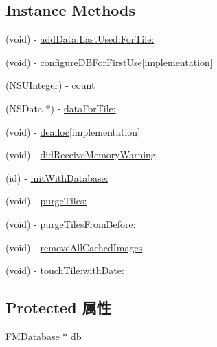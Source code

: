 \subsection*{Instance Methods}
\begin{DoxyCompactItemize}
\item 
(void) -\/ \hyperlink{interface_r_m_tile_cache_d_a_o_aa0f837ba4f88e61e11f80539ab4447b6}{add\-Data\-:\-Last\-Used\-:\-For\-Tile\-:}
\item 
(void) -\/ \hyperlink{interface_r_m_tile_cache_d_a_o_a5576502807bbdfbe130364ccf543f944}{configure\-D\-B\-For\-First\-Use}{\ttfamily  \mbox{[}implementation\mbox{]}}
\item 
(N\-S\-U\-Integer) -\/ \hyperlink{interface_r_m_tile_cache_d_a_o_a2781dde5bf63915b2a7a759b328473bd}{count}
\item 
(N\-S\-Data $\ast$) -\/ \hyperlink{interface_r_m_tile_cache_d_a_o_a83bb633ee07230152bf11382fd065da3}{data\-For\-Tile\-:}
\item 
(void) -\/ \hyperlink{interface_r_m_tile_cache_d_a_o_aa0313e459b023f60fdbefd5635f35e57}{dealloc}{\ttfamily  \mbox{[}implementation\mbox{]}}
\item 
(void) -\/ \hyperlink{interface_r_m_tile_cache_d_a_o_af5ca74dfbe1355cbd479ed7844fd03da}{did\-Receive\-Memory\-Warning}
\item 
(id) -\/ \hyperlink{interface_r_m_tile_cache_d_a_o_a255de16d0b9de6c9974f48dd2ec0f0c3}{init\-With\-Database\-:}
\item 
(void) -\/ \hyperlink{interface_r_m_tile_cache_d_a_o_ae44d63a1f9fc1da15fbb9dbac7129b61}{purge\-Tiles\-:}
\item 
(void) -\/ \hyperlink{interface_r_m_tile_cache_d_a_o_a548b34364c0234d3cca2e9076a6409cb}{purge\-Tiles\-From\-Before\-:}
\item 
(void) -\/ \hyperlink{interface_r_m_tile_cache_d_a_o_ab185029f5a4e0631fcd81763e951cb1c}{remove\-All\-Cached\-Images}
\item 
(void) -\/ \hyperlink{interface_r_m_tile_cache_d_a_o_a04141d25629d2dca5ffe48b50d7bf1b1}{touch\-Tile\-:with\-Date\-:}
\end{DoxyCompactItemize}
\subsection*{Protected 属性}
\begin{DoxyCompactItemize}
\item 
F\-M\-Database $\ast$ \hyperlink{interface_r_m_tile_cache_d_a_o_a518b8e556139a0f18ab610ade61d76ed}{db}
\end{DoxyCompactItemize}


